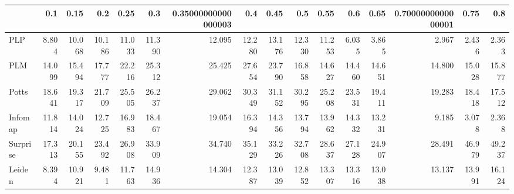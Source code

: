\begin{tabular}{lrrrrrrrrrrrrrrr}
\toprule
{} &    0.1 &   0.15 &    0.2 &   0.25 &    0.3 & 0.35000000000000003 &    0.4 &   0.45 &    0.5 &   0.55 &    0.6 &   0.65 & 0.7000000000000001 &   0.75 &    0.8 \\
\midrule
PLP      &  8.804 & 10.068 & 10.186 & 11.033 & 11.390 &              12.095 & 12.280 & 13.176 & 12.330 & 11.253 &  6.035 &  3.865 &              2.967 &  2.436 &  2.363 \\
PLM      & 14.099 & 15.494 & 17.777 & 22.216 & 25.312 &              25.425 & 27.654 & 23.790 & 16.858 & 14.627 & 14.460 & 14.651 &             14.800 & 15.028 & 15.877 \\
Potts    & 18.641 & 19.317 & 21.709 & 25.505 & 26.237 &              29.062 & 30.349 & 31.152 & 30.295 & 25.208 & 23.531 & 19.411 &             19.283 & 18.418 & 17.512 \\
Infomap  & 11.814 & 14.024 & 12.725 & 16.983 & 18.467 &              19.054 & 16.394 & 14.356 & 13.794 & 13.962 & 14.332 & 13.231 &              9.185 &  3.078 &  2.368 \\
Surprise & 17.313 & 20.155 & 23.492 & 26.908 & 33.909 &              34.740 & 35.129 & 33.226 & 32.708 & 28.637 & 27.128 & 24.907 &             28.491 & 46.979 & 49.237 \\
Leiden   &  8.394 & 10.921 &  9.481 & 11.763 & 14.936 &              14.304 & 12.387 & 13.039 & 12.852 & 13.307 & 13.316 & 13.038 &             13.137 & 13.991 & 16.124 \\
\bottomrule
\end{tabular}
